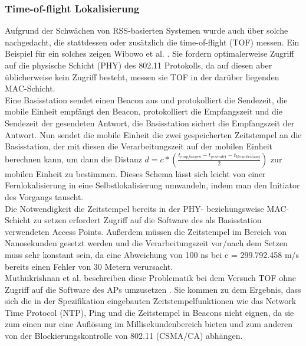 \subsubsection{Time-of-flight Lokalisierung}
\label{ch:Vorherige:sec:TOF}
Aufgrund der Schwächen von RSS-basierten Systemen wurde auch über solche nachgedacht, die stattdessen oder zusätzlich die time-of-flight (TOF) messen. 
Ein Beispiel für ein solches zeigen Wibowo et al. \cite{wibowo2009time}. 
Sie fordern optimalerweise Zugriff auf die physische Schicht (PHY) des 802.11 Protokolls, da auf diesen aber üblicherweise kein Zugriff besteht, messen sie TOF in der darüber liegenden MAC-Schicht.\\
Eine Basisstation sendet einen Beacon aus und protokolliert die Sendezeit, die mobile Einheit empfängt den Beacon, protokolliert die Empfangszeit und die Sendezeit der gesendeten Antwort, die Basisstation sichert die Empfangszeit der Antwort.
Nun sendet die mobile Einheit die zwei gespeicherten Zeitstempel an die Basisstation, der mit diesen die Verarbeitungszeit auf der mobilen Einheit berechnen kann, um dann die Distanz $d = c * (\frac{t_{empfangen} - t_{gesendet} - t_{Verarbeitung}}{2})$ zur mobilen Einheit zu bestimmen.
Dieses Schema lässt sich leicht von einer Fernlokalisierung in eine Selbstlokalisierung umwandeln, indem man den Initiator des Vorgangs tauscht.\\
Die Notwendigkeit die Zeitstempel bereits in der PHY- beziehungsweise MAC-Schicht zu setzen erfordert Zugriff auf die Software des als Basisstation verwendeten Access Points. 
Außerdem müssen die Zeitstempel im Bereich von Nanosekunden gesetzt werden und die Verarbeitungszeit vor/nach dem Setzen muss sehr konstant sein, da eine Abweichung von 100 ns bei c = 299.792.458 m/s bereits einen Fehler von 30 Metern verursacht.\\
Muthukrishnan et al. beschreiben diese Problematik bei dem Versuch TOF ohne Zugriff auf die Software des APs umzusetzen \cite{muthukrishnan2006using}.
Sie kommen zu dem Ergebnis, dass sich die in der Spezifikation eingebauten Zeitstempelfunktionen wie das Network Time Protocol (NTP), Ping und die Zeitstempel in Beacons nicht eignen, da sie zum einen nur eine Auflösung im Millisekundenbereich bieten und zum anderen von der Blockierungskontrolle von 802.11 (CSMA/CA) abhängen.

